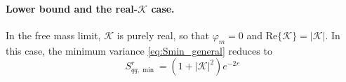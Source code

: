 \paragraph{Lower bound and the real-\(\mathcal{K}\) case.}
In the free mass limit, \(\mathcal{K}\) is purely real, so that \(\varphi_m=0\) and \(\mathrm{Re}\{\mathcal{K}\}=|\mathcal{K}|\). In this case, the minimum variance \eqref{eq:Smin_general} reduces to
\[
S^{r}_{qq,\min}=(1+|\mathcal{K}|^{2})e^{-2r} 
\]